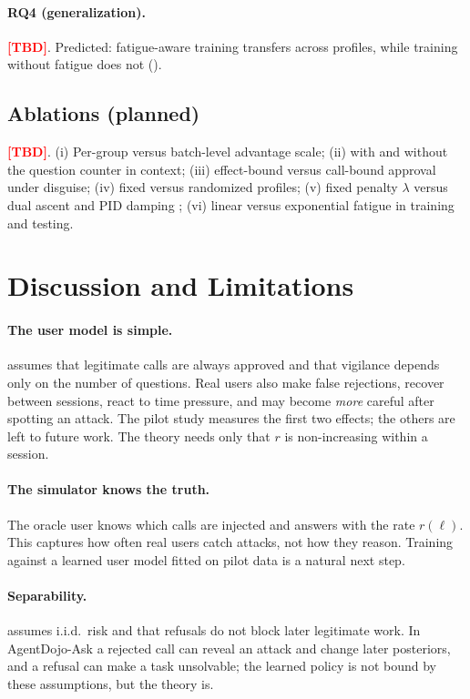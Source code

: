 \documentclass[10pt]{article}
\newcommand{\TBD}{\textcolor{red}{\textbf{[TBD]}}\xspace}
\newcommand{\ADA}{AgentDojo-Ask\xspace}
\theoremstyle{plain}
\theoremstyle{definition}
\begin{document}
\paragraph{RQ4 (generalization).} \TBD. Predicted: fatigue-aware training transfers across profiles, while training without fatigue does not ().

\subsection{Ablations (planned)}\label{sec:ablations}

\TBD. (i) Per-group versus batch-level advantage scale; (ii) with and without the question counter in context; (iii) effect-bound versus call-bound approval under disguise; (iv) fixed versus randomized profiles; (v) fixed penalty $\lambda$ versus dual ascent and PID damping \citep{stooke2020pid}; (vi) linear versus exponential fatigue in training and testing.

\section{Discussion and Limitations}\label{sec:discussion}

\paragraph{The user model is simple.}  assumes that legitimate calls are always approved and that vigilance depends only on the number of questions. Real users also make false rejections, recover between sessions, react to time pressure, and may become \emph{more} careful after spotting an attack. The pilot study measures the first two effects; the others are left to future work. The theory needs only that $r$ is non-increasing within a session.

\paragraph{The simulator knows the truth.} The oracle user knows which calls are injected and answers with the rate $r(\ell)$. This captures how often real users catch attacks, not how they reason. Training against a learned user model fitted on pilot data is a natural next step.

\paragraph{Separability.}  assumes i.i.d.\ risk and that refusals do not block later legitimate work. In \ADA a rejected call can reveal an attack and change later posteriors, and a refusal can make a task unsolvable; the learned policy is not bound by these assumptions, but the theory is.
\end{document}
